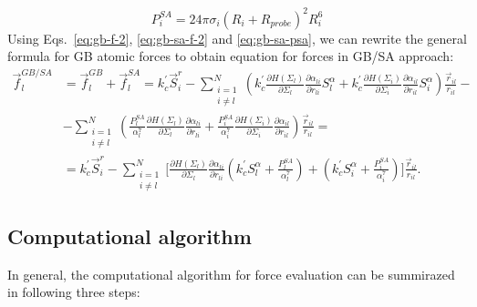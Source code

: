 \documentclass[11pt]{book}
\begin{document}
\begin{equation}\label{eq:gb-sa-psa}
P^{SA}_{i}=24\pi\sigma_{i}\left(R_{i}+R_{probe}\right)^{2}R_{i}^{6}
\end{equation}
Using Eqs.~\ref{eq:gb-f-2}, \ref{eq:gb-sa-f-2} and \ref{eq:gb-sa-psa}, we can rewrite the general formula for GB atomic forces to obtain equation for forces in GB/SA approach:
\begin{equation}\label{eq:gbsa-f-1}
\begin{split}
\vec{f}_{l}^{GB/SA}&=\vec{f}_{l}^{GB}+\vec{f}_{l}^{SA}=k_{c}^{\prime}\vec{S}^{r}_{i}-\sum_{\substack{i=1\\i\ne l}}^{N}\left(k_{c}^{\prime}\frac{\partial H(\Sigma_{l})}{\partial \Sigma_{l}}\frac{\partial \alpha_{li}}{\partial r_{li}}S^{\alpha}_{l}+k_{c}^{\prime}\frac{\partial H(\Sigma_{i})}{\partial \Sigma_{i}}\frac{\partial \alpha_{il}}{\partial r_{il}}S^{\alpha}_{i}\right)\frac{\vec{r}_{il}}{r_{il}}-\\
&-\sum_{\substack{i=1\\i\ne l}}^{N}\left(\frac{P^{SA}_{l}}{\alpha_{l}^{7}}\frac{\partial H(\Sigma_{l})}{\partial\Sigma_{l}}\frac{\partial\alpha_{li}}{\partial r_{li}}+\frac{P^{SA}_{i}}{\alpha_{i}^{7}}\frac{\partial H(\Sigma_{i})}{\partial\Sigma_{i}}\frac{\partial\alpha_{il}}{\partial r_{il}}\right)\frac{\vec{r}_{il}}{r_{il}}=\\
&=k_{c}^{\prime}\vec{S}^{r}_{i}-\sum_{\substack{i=1\\i\ne l}}^{N}\Bigg[\frac{\partial H(\Sigma_{l})}{\partial \Sigma_{l}}\frac{\partial \alpha_{li}}{\partial r_{li}}\left(k_{c}^{\prime}S^{\alpha}_{l}+\frac{P^{SA}_{l}}{\alpha_{l}^{7}}\right)+\left(k_{c}^{\prime}S^{\alpha}_{i}+\frac{P^{SA}_{i}}{\alpha_{i}^{7}}\right)\Bigg]\frac{\vec{r}_{il}}{r_{il}}.
\end{split}
\end{equation}


\subsection{Computational algorithm}

In general, the computational algorithm for force evaluation can be summirazed in following three steps:
\end{document}
